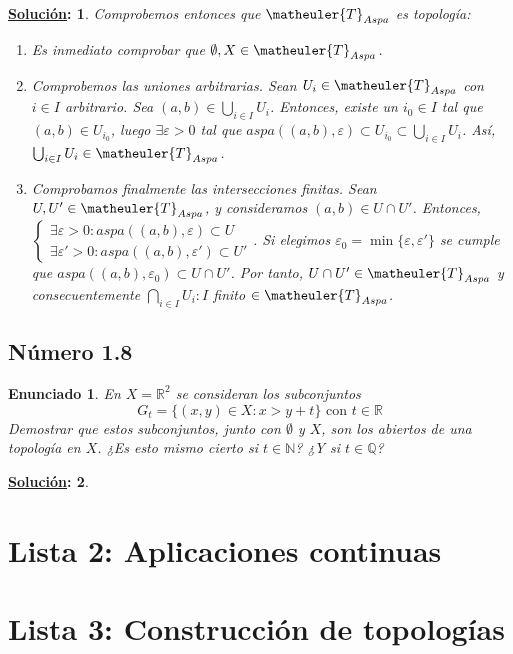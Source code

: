 \documentclass[10pt,a4paper,openright]{book}
\theoremstyle{break}
\newtheorem*{enun}{Enunciado}
\newtheorem*{ej}{\underline{Solución}:}
\begin{document}
\begin{ej}
Comprobemos entonces que $\matheuler{T}_{Aspa}$ es topología:
\begin{enumerate}[label={(\arabic*)}]
\item Es inmediato comprobar que $\emptyset, X \in \matheuler{T}_{Aspa}$.
\item Comprobemos las uniones arbitrarias. Sean $U_i \in \matheuler{T}_{Aspa}$ con $i \in I$ arbitrario. Sea $(a,b) \in \bigcup_{i \in I} U_i$. Entonces, existe un $i_0 \in I$ tal que $(a,b) \in U_{i_0}$, luego $\exists \varepsilon > 0$ tal que $aspa((a,b), \varepsilon) \subset U_{i_0} \subset \bigcup_{i \in I} U_i$. Así, $\bigcup_{i \in I} U_i \in \matheuler{T}_{Aspa}$.
\item Comprobamos finalmente las intersecciones finitas. Sean $U, U' \in \matheuler{T}_{Aspa}$, y consideramos $(a,b) \in U \cap U'$. Entonces, $\begin{cases} \exists \varepsilon > 0 : aspa((a,b), \varepsilon) \subset U \\ \exists \varepsilon' > 0 : aspa((a,b), \varepsilon') \subset U' \end{cases}$. Si elegimos $\varepsilon_0 = \min \{\varepsilon, \varepsilon'\}$ se cumple que $aspa((a,b), \varepsilon_0) \subset U \cap U'$. Por tanto, $U \cap U' \in \matheuler{T}_{Aspa}$ y consecuentemente $\bigcap_{i \in I} U_i : I$ finito $\in \matheuler{T}_{Aspa}$.
\end{enumerate}
\end{ej}

\section{Número 1.8}
\begin{enun}
En $X = \mathbb{R}^2$ se consideran los subconjuntos $$G_t = \{(x,y) \in X : x > y + t\} \mbox{ con } t \in \mathbb{R}$$
Demostrar que estos subconjuntos, junto con $\emptyset$ y $X$, son los abiertos de una topología en $X$. ¿Es esto mismo cierto si $t \in \mathbb{N}$? ¿Y si $t \in \mathbb{Q}$?
\end{enun}
\begin{ej}
\end{ej}
\chapter{Lista 2: Aplicaciones continuas}%
\label{cha:lista2}

\chapter{Lista 3: Construcción de topologías}%
\label{cha:lista3}
\end{document}
